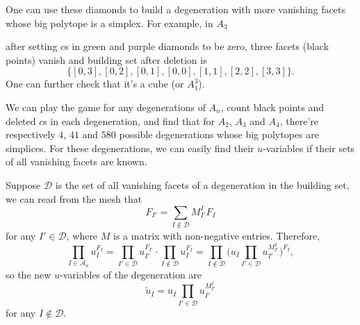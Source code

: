 \documentclass[hidelinks,12pt]{article}
\begin{document}
One can use these diamonds to build a degeneration with more vanishing facets whose big polytope is a simplex. For example, in $A_3$
\begin{center}
\end{center}
after setting $c$s in green and purple diamonds to be zero, three facets (black points) vanish and building set after deletion is 
\[
	\{[0,3],[0,2],[0,1],[0,0],[1,1],[2,2],[3,3]\}.
\]
One can further check that it's a cube (or $A_1^3$).

We can play the game for any degenerations of $A_n$, count black points and deleted $c$s in each degeneration, and find that for $A_2$, $A_3$ and $A_4$, there're respectively $4$, $41$ and $580$ possible degenerations whose big polytopes are simplices. For these degenerations, we can easily find their $u$-variables if their sets of all vanishing facets are known.

Suppose $\mathscr D$ is the set of all vanishing facets of a degeneration in the building set, 
we can read from the mesh that
\[
F_{I'}=\sum_{I\not\in \mathscr D}M_{I'}^IF_I
\]
for any $I'\in \mathscr D$, where $M$ is a matrix with non-negative entries. 
Therefore,
\[
\prod_{I\in \mathscr A_n}u_{I}^{F_{I}}=
\prod_{I'\in \mathscr D}u_{I'}^{F_{I'}}
\cdot
\prod_{I\not\in \mathscr D}u_{I}^{F_{I}}=
\prod_{I\not\in \mathscr D}\biggl(
u_I\prod_{I'\in \mathscr D}u_{I'}^{M_{I'}^I}
\bigg)^{F_I},
\]
so the new $u$-variables of the degeneration are
\[
    \tilde u_{I}=u_I\prod_{I'\in \mathscr D}u_{I'}^{M_{I'}^I}
\]
for any $I\not\in \mathscr D$. 
\end{document}
